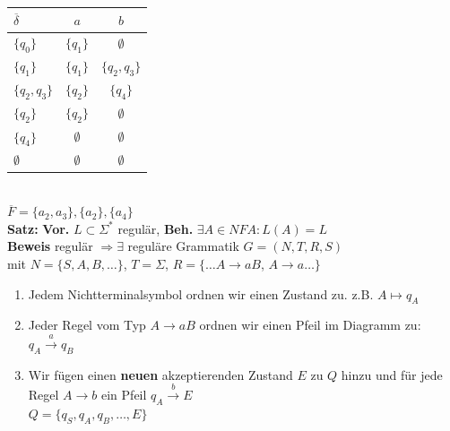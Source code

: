 \documentclass[10pt]{article}
\newcommand{\Bold}[1]{\textbf{#1}} %
\newcommand{\Oben}[2]{\overset{#1}{#2}} %
\begin{document}
\begin{tabular}{l|c|c}
 $\overline{\delta}$&$a$&$b$\\\hline
 $\{q_0\}$&$\{q_1\}$&$\emptyset$\\
 $\{q_1\}$&$\{q_1\}$&$\{q_2,q_3\}$\\
 $\{q_2,q_3\}$&$\{q_2\}$&$\{q_4\}$\\
 $\{q_2\}$&$\{q_2\}$&$\emptyset$\\
 $\{q_4\}$&$\emptyset$&$\emptyset$\\
 $\emptyset$&$\emptyset$&$\emptyset$\\
\end{tabular}\\
$\overline{F}=\{a_2,a_3\},\{a_2\},\{a_4\}$\\
\Bold{Satz:} \Bold{Vor.} $L\subset \Sigma^*$ regul\"ar, \Bold{Beh.} $\exists A\in NFA:L(A)=L$\\
\Bold{Beweis} regul\"ar $\Rightarrow\exists$ regul\"are Grammatik $G=(N,T,R,S)$\\
mit $N=\{S,A,B,\dots\}$, $T=\Sigma$, $R=\{\dots A\to aB$, $A\to a\dots\}$
\begin{enumerate}
 \item Jedem Nichtterminalsymbol ordnen wir einen Zustand zu. z.B. $A\mapsto q_A$
 \item Jeder Regel vom Typ $A\to aB$ ordnen wir einen Pfeil im Diagramm zu: $q_A\Oben{a}{\to}q_B$
 \item Wir f\"ugen einen \Bold{neuen} akzeptierenden Zustand $E$ zu $Q$ hinzu und f\"ur jede Regel $A\to b$ ein Pfeil $q_A\Oben{b}{\to}E$\\
 $Q=\{q_S,q_A,q_B,\dots,E\}$
\end{enumerate}
\end{document}
